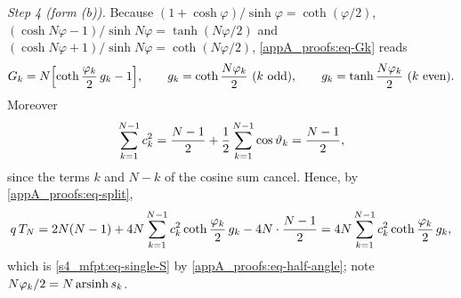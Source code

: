 \emph{Step 4 (form (b)).} Because $(1+\cosh\varphi)/\sinh\varphi=\coth(\varphi/2)$,
$(\cosh N\varphi-1)/\sinh N\varphi=\tanh(N\varphi/2)$ and $(\cosh N\varphi+1)/\sinh N\varphi=\coth(N\varphi/2)$,
\eqref{appA_proofs:eq-Gk} reads
\begin{equation}\label{appA_proofs:eq-Gk-coth}
  G_k=N\Bigl[\coth\frac{\varphi_{k}}{2}\,g_k-1\Bigr],\qquad
  g_k=\coth\frac{N\varphi_{k}}{2}\ (k\ \text{odd}),\qquad g_k=\tanh\frac{N\varphi_{k}}{2}\ (k\ \text{even}).
\end{equation}
Moreover
\begin{equation}\label{appA_proofs:eq-csum}
  \sum_{k=1}^{N-1}c_{k}^{2}=\frac{N-1}{2}+\frac12\sum_{k=1}^{N-1}\cos\vartheta_{k}=\frac{N-1}{2},
\end{equation}
since the terms $k$ and $N-k$ of the cosine sum cancel. Hence, by \eqref{appA_proofs:eq-split},
\[
  q\,T_{N}=2N(N-1)+4N\sum_{k=1}^{N-1}c_{k}^{2}\coth\frac{\varphi_{k}}{2}\,g_k-4N\cdot\frac{N-1}{2}
        =4N\sum_{k=1}^{N-1}c_{k}^{2}\coth\frac{\varphi_{k}}{2}\,g_k ,
\]
which is \eqref{s4_mfpt:eq-single-S} by \eqref{appA_proofs:eq-half-angle}; note $N\varphi_{k}/2=N\operatorname{arsinh}s_{k}$.

